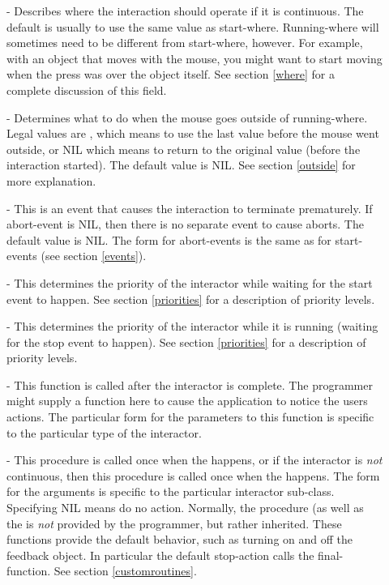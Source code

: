 \begin{description}
\item[] 
- Describes where the interaction should operate if it is continuous.  The
default is usually to use the same value as start-where.  Running-where
will sometimes
need to be different from start-where, however.  For example, with an
object that moves with the mouse,
you might want to start moving when the press was over the object itself.
See section \ref{where} for a complete discussion of this field.

\item[] 
- Determines what to do when the mouse goes outside of running-where.
Legal values are , which means to use the last value before the
mouse went outside, or NIL which
means to return to the original value (before the interaction
started).  The default value is NIL.
See section \ref{outside} for more explanation.

\item[] 
- This is an event that causes the interaction to terminate prematurely.
If abort-event is NIL, then there is no separate event to cause aborts.
The default value is NIL.  The form for abort-events is the same as for
start-events (see section \ref{events}).

\item[] 
- This determines the priority of the interactor while waiting for the
start event to happen.  See section \ref{priorities} for a description of
priority levels.

\item[] 
- This determines the priority of the interactor while it is running
(waiting for the stop event to happen).  See section \ref{priorities} for a
description of priority levels.

\item[] 
- This function is called after the interactor is complete.  The programmer
might supply a function here to cause the application to notice the users
actions.  The particular form for the parameters to this function is
specific to the particular type of the interactor.

\item[] 
- This procedure is called once when the  happens,
or if the interactor is {\it not} continuous, then this procedure is called once
when the  happens.  The form for the arguments is specific to the
particular interactor sub-class.   Specifying NIL means do no action.
Normally, the  procedure (as well as the  is {\it not} provided by the programmer, but rather
inherited.  These functions provide the default behavior, such as turning
on and off the feedback object.  In particular the default stop-action
calls the final-function.  See section \ref{customroutines}.


\end{description}
